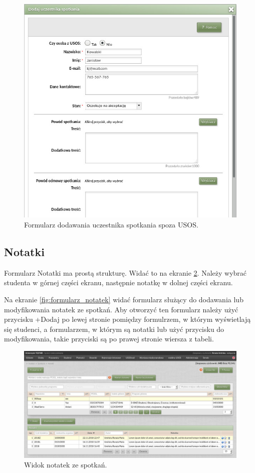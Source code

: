 \documentclass[licencjacka]{pracamgr}
\begin{document}
\begin{figure}[!]
  \includegraphics[width=\linewidth]{formularz_uczestnikow_nieUSOS.jpg}
  \caption{Formularz dodawania uczestnika spotkania spoza USOS.}
  \label{fig:kalenformucznieusosadm}
\end{figure}

\subsection{Notatki}
Formularz Notatki ma prostą strukturę. Widać to na ekranie \ref{fig:notatki}. Należy wybrać studenta w górnej części ekranu, następnie notatkę w dolnej części ekranu.

Na ekranie \ref{fig:formularz_notatek} widać formularz służący do dodawania lub modyfikowania notatek ze spotkań. Aby otworzyć ten 
formularz należy użyć przycisku \textsf{+Dodaj} po lewej stronie pomiędzy formulrzem, w którym wyświetlają się studenci, a formularzem, w którym są 
notatki lub użyć przycisku do modyfikowania, takie przyciski są po prawej stronie wiersza z tabeli.

\begin{figure}[!]
  \includegraphics[width=\linewidth]{widok_notatek.jpg}
  \caption{Widok notatek ze spotkań.}
  \label{fig:notatki}
\end{figure}
\end{document}
